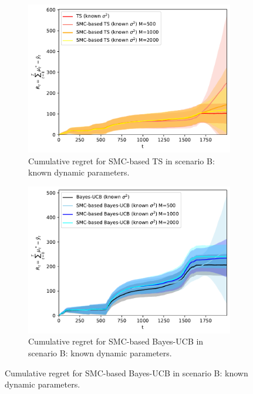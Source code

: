 \begin{figure}[!h]
	\centering
	\begin{subfigure}[b]{0.45\textwidth}
		\includegraphics[width=\textwidth]{./fods_figs/dynamic/linearGaussian/b_selectedM_cumulative_regret_dknown_ts_knownsigma}
		\caption{Cumulative regret for SMC-based TS in scenario B: known dynamic parameters.}
		\label{fig:dynamic_bandits_linearGaussian_b_ts_dknown_knownsigma_M}
	\end{subfigure}\qquad
	\begin{subfigure}[b]{0.45\textwidth}
		\includegraphics[width=\textwidth]{./fods_figs/dynamic/linearGaussian/b_selectedM_cumulative_regret_dknown_bucb_knownsigma}
		\caption{Cumulative regret for SMC-based Bayes-UCB in scenario B: known dynamic parameters.}
		\label{fig:dynamic_bandits_linearGaussian_b_bucb_dknown_knownsigma_M}
	\end{subfigure}
	

\end{figure}
